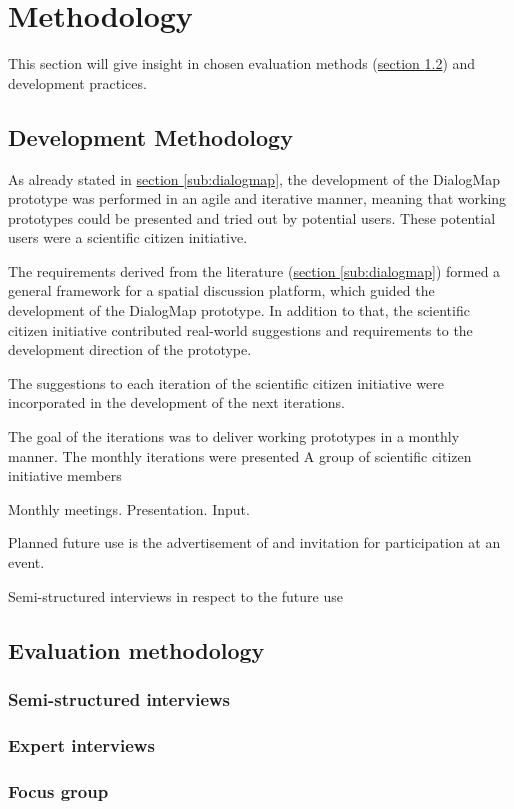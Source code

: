 \section{Methodology}
\label{chap:methodology}
This section will give insight in chosen evaluation methods (\hyperref[subchap:ev_methodology]{section \ref{subchap:ev_methodology}}) and development practices.


\subsection{Development Methodology}
As already stated in \hyperref[sub:dialogmap]{section \ref{sub:dialogmap}}, the development of the DialogMap prototype was performed in an agile and iterative manner, meaning that working prototypes could be presented and tried out by potential users. These potential users were a scientific citizen initiative.


The requirements derived from the literature (\hyperref[sub:dialogmap]{section \ref{sub:dialogmap}}) formed a general framework for a spatial discussion platform, which guided the development of the DialogMap prototype. In addition to that, the scientific citizen initiative contributed real-world suggestions and requirements to the development direction of the prototype.


The suggestions to each iteration of the scientific citizen initiative were incorporated in the development of the next iterations. 



The goal of the iterations was to deliver working prototypes in a monthly manner. The monthly iterations were presented A group of scientific citizen initiative members 


Monthly meetings. Presentation. Input.

Planned future use is the advertisement of and invitation for participation at an event.

Semi-structured interviews in respect to the future use

\subsection{Evaluation methodology}
\label{subchap:ev_methodology}

\subsubsection{Semi-structured interviews}

\subsubsection{Expert interviews}

\subsubsection{Focus group}


